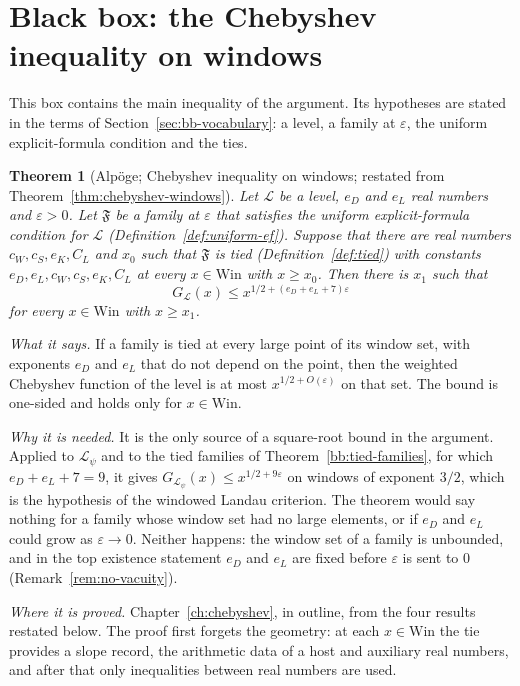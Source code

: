 \documentclass[11pt]{amsbook}
\theoremstyle{plain}
\newtheorem{theorem}{Theorem}[section]
\theoremstyle{definition}
\theoremstyle{remark}
\numberwithin{equation}{section}
\numberwithin{figure}{chapter}
\numberwithin{table}{chapter}
\newcommand{\eps}{\varepsilon}
\newcommand{\lev}{\mathscr{L}}
\newcommand{\Fam}{\mathfrak{F}}
\newcommand{\Win}{\mathrm{Win}}
\begin{document}
\section{Black box: the Chebyshev inequality on windows}
\label{sec:bb-chebyshev}

This box contains the main inequality of the argument. Its
hypotheses are stated in the
terms of Section~\ref{sec:bb-vocabulary}: a level, a family at
$\eps$, the uniform explicit-formula condition and the ties.

\begin{theorem}[Alp\"oge; Chebyshev inequality on windows; restated
from Theorem~\ref{thm:chebyshev-windows}]
\label{bb:chebyshev-windows}
Let $\lev$ be a level, $e_D$ and $e_L$ real numbers and $\eps>0$. Let
$\Fam$ be a family at $\eps$ that satisfies the uniform
explicit-formula condition for $\lev$ (Definition~\ref{def:uniform-ef}).
Suppose that there are real numbers $c_W,c_S,e_K,C_L$ and $x_0$ such
that $\Fam$ is tied (Definition~\ref{def:tied}) with constants
$e_D,e_L,c_W,c_S,e_K,C_L$ at every $x\in\Win$ with $x\ge x_0$. Then
there is $x_1$ such that
\[
G_\lev(x)\le x^{1/2+(e_D+e_L+7)\eps}
\]
for every $x\in\Win$ with $x\ge x_1$.
\end{theorem}

\noindent\emph{What it says.} If a family is tied at every large
point of its window set, with exponents $e_D$ and $e_L$ that do not
depend on the point, then the weighted Chebyshev function of the
level is at most $x^{1/2+O(\eps)}$ on that set. The bound is
one-sided and holds only for $x\in\Win$.

\noindent\emph{Why it is needed.} It is the only source of a
square-root bound in the argument. Applied to $\lev_\psi$ and to the
tied families of Theorem~\ref{bb:tied-families}, for which
$e_D+e_L+7=9$, it gives $G_{\lev_\psi}(x)\le x^{1/2+9\eps}$ on
windows of exponent $3/2$, which is the hypothesis of the windowed
Landau criterion. The theorem would say nothing for a family whose
window set had no large elements, or if $e_D$ and $e_L$ could grow as
$\eps\to0$. Neither happens: the window set of a family is unbounded,
and in the top existence statement $e_D$ and $e_L$ are fixed before
$\eps$ is sent to $0$ (Remark~\ref{rem:no-vacuity}).

\noindent\emph{Where it is proved.} Chapter~\ref{ch:chebyshev}, in
outline, from the four results restated below. The proof first
forgets the geometry: at each $x\in\Win$ the tie provides a slope
record, the arithmetic data of a host and auxiliary real numbers,
and after that only inequalities between real numbers are used.
\end{document}
